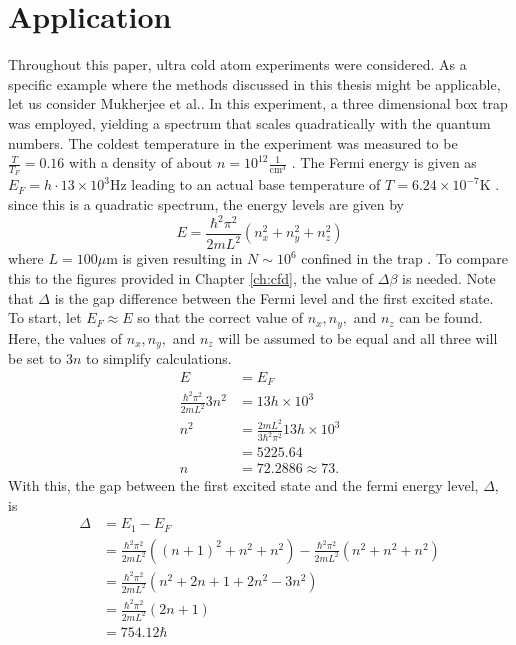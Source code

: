 \section{Application}
Throughout this paper, ultra cold atom experiments were considered. As a specific example where the methods discussed in this thesis might be applicable, let us consider Mukherjee et al.\@ \cite{Mukherjee2017}. In this experiment, a three dimensional box trap was employed, yielding a spectrum that scales quadratically with the quantum numbers. The coldest temperature in the experiment was measured to be $\frac{T}{T_F}=0.16$ with a density of about $n=10^{12}\frac{1}{\text{cm}^3}$ \cite{Mukherjee2017}. The Fermi energy is given as $E_F=h \cdot 13\times 10^3$Hz leading to an actual base temperature of $T=6.24\times 10^{-7}\text{K}$ \cite{Mukherjee2017}. since this is a quadratic spectrum, the energy levels are given by 
\begin{equation*}
    E=\frac{\hbar^2 \pi^2}{2mL^2}(n_x^2+n_y^2+n_z^2)
\end{equation*}
where $L=100 \mu$m is given resulting in $N\sim 10^6$ confined in the trap \cite{Mukherjee2017}. To compare this to the figures provided in Chapter \ref{ch:cfd}, the value of $\Delta\beta$ is needed. Note that $\Delta$ is the gap difference between the Fermi level and the first excited state. To start, let $E_F\approx E$ so that the correct value of $n_x, n_y,$ and $n_z$ can be found. Here, the values of $n_x, n_y,$ and $n_z$ will be assumed to be equal and all three will be set to $3n$ to simplify calculations.
\begin{align*}
    E&= E_F\\
    \frac{\hbar^2\pi^2}{2mL^2} 3n^2&=13h\times 10^3\\
    n^2&=\frac{2mL^2}{3\hbar^2 \pi^2}13h\times 10^3\\
    &=5225.64\\
    n&=72.2886\approx 73.
\end{align*}
With this, the gap between the first excited state and the fermi energy level, $\Delta$, is
\begin{align*}
    \Delta&=E_1-E_F\\
    &=\frac{\hbar^2\pi^2}{2mL^2}((n+1)^2+n^2+n^2)-\frac{\hbar^2\pi^2}{2mL^2}(n^2+n^2+n^2)\\
    &=\frac{\hbar^2\pi^2}{2mL^2}(n^2+2n+1+2n^2-3n^2)\\
    &=\frac{\hbar^2 \pi^2}{2mL^2} (2n+1)\\
    &=754.12\hbar
\end{align*}
